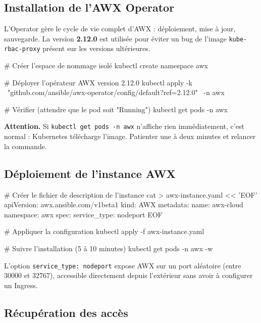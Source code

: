 \documentclass[a4paper]{article}
\newcommand{\cmd}[1]{\texttt{#1}}
\begin{document}
\subsection{Installation de l'AWX Operator}

L'Operator gère le cycle de vie complet d'AWX : déploiement, mise à jour, sauvegarde. La version \textbf{2.12.0} est utilisée pour éviter un bug de l'image \cmd{kube-rbac-proxy} présent sur les versions ultérieures.

\begin{bashcode}
# Créer l'espace de nommage isolé
kubectl create namespace awx

# Déployer l'opérateur AWX version 2.12.0
kubectl apply -k \
  "github.com/ansible/awx-operator/config/default?ref=2.12.0" \
  -n awx

# Vérifier (attendre que le pod soit "Running")
kubectl get pods -n awx
\end{bashcode}

\begin{warnbox}
  \textbf{Attention.} Si \cmd{kubectl get pods -n awx} n'affiche rien immédiatement, c'est normal : Kubernetes télécharge l'image. Patienter une à deux minutes et relancer la commande.
\end{warnbox}

\subsection{Déploiement de l'instance AWX}

\begin{bashcode}
# Créer le fichier de description de l'instance
cat > awx-instance.yaml << 'EOF'
apiVersion: awx.ansible.com/v1beta1
kind: AWX
metadata:
  name: awx-cloud
  namespace: awx
spec:
  service_type: nodeport
EOF

# Appliquer la configuration
kubectl apply -f awx-instance.yaml

# Suivre l'installation (5 à 10 minutes)
kubectl get pods -n awx -w
\end{bashcode}

L'option \cmd{service\_type: nodeport} expose AWX sur un port aléatoire (entre 30000 et 32767), accessible directement depuis l'extérieur sans avoir à configurer un Ingress.

\subsection{Récupération des accès}
\end{document}
